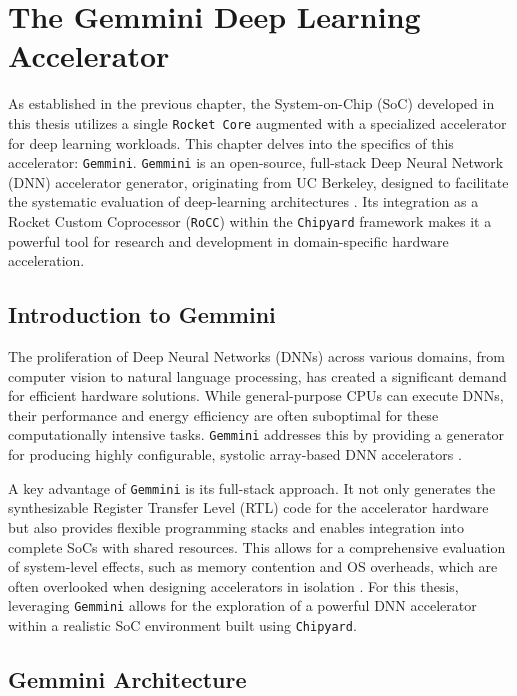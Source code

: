 \chapter{The Gemmini Deep Learning Accelerator}
\label{chap:GemminiAccelerator}

As established in the previous chapter, the System-on-Chip (SoC) developed in this thesis utilizes a single \texttt{Rocket Core} augmented with a specialized accelerator for deep learning workloads. This chapter delves into the specifics of this accelerator: \texttt{Gemmini}. \texttt{Gemmini} is an open-source, full-stack Deep Neural Network (DNN) accelerator generator, originating from UC Berkeley, designed to facilitate the systematic evaluation of deep-learning architectures \cite{gemini-dac}. Its integration as a Rocket Custom Coprocessor (\texttt{RoCC}) within the \texttt{Chipyard} framework makes it a powerful tool for research and development in domain-specific hardware acceleration.

\section{Introduction to Gemmini}
\label{sec:gemmini_introduction}

The proliferation of Deep Neural Networks (DNNs) across various domains, from computer vision to natural language processing, has created a significant demand for efficient hardware solutions. While general-purpose CPUs can execute DNNs, their performance and energy efficiency are often suboptimal for these computationally intensive tasks. \texttt{Gemmini} addresses this by providing a generator for producing highly configurable, systolic array-based DNN accelerators \cite{genc2019gemmini}.

A key advantage of \texttt{Gemmini} is its full-stack approach. It not only generates the synthesizable Register Transfer Level (RTL) code for the accelerator hardware but also provides flexible programming stacks and enables integration into complete SoCs with shared resources. This allows for a comprehensive evaluation of system-level effects, such as memory contention and OS overheads, which are often overlooked when designing accelerators in isolation \cite{gemini-dac}. For this thesis, leveraging \texttt{Gemmini} allows for the exploration of a powerful DNN accelerator within a realistic SoC environment built using \texttt{Chipyard}.

\section{Gemmini Architecture}
\label{sec:gemmini_architecture}

